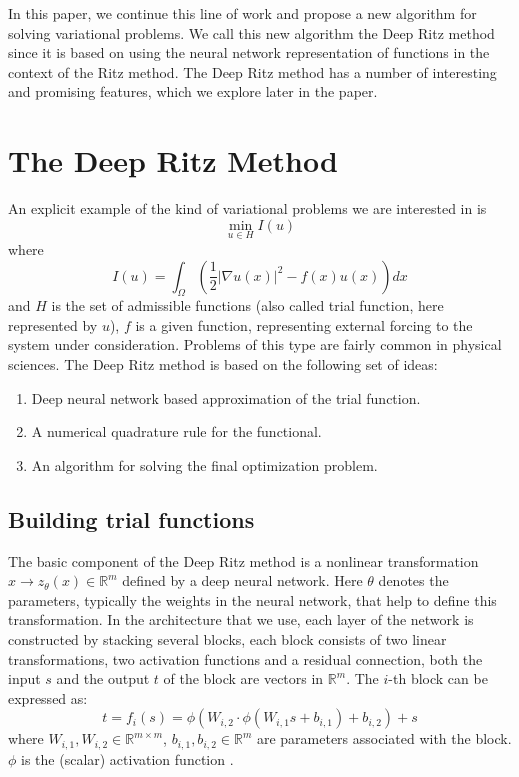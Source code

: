 \documentclass[a4paper,12pt]{article}
\begin{document}
In this paper, we continue this line of work and propose a new
algorithm for solving variational problems. We call this new algorithm
the Deep Ritz method since it is based on using the neural
network representation of functions in the context of the Ritz method.
The Deep Ritz method has a number of interesting and promising features,
which we explore later in the paper.


\section{The Deep Ritz Method}

An explicit example of the kind of variational problems we are interested
in is \cite{Evans}
\begin{equation}
\min_{u \in H} I(u)
\end{equation}
where
\begin{equation}
I(u) = \int_{\Omega} \left( \frac 12  |\nabla u(x)|^2 -  f(x) u(x) \right) dx
\label{I(u)}
\end{equation}
and $H$ is the set of admissible functions (also called
trial function, here represented by $u$), 
$f$ is a given function, representing
external forcing to the system under consideration.
Problems of this type are fairly common in physical sciences.
The Deep Ritz method is based on the following set of ideas:

\begin{enumerate}
\item Deep neural network based approximation of the trial function.
\item A numerical quadrature rule for the functional.
\item An algorithm for solving the final optimization problem.
\end{enumerate}


\subsection{Building trial functions}

The basic component of the Deep Ritz method is a nonlinear transformation $ x \rightarrow z_\theta (x)\in \mathbb{R}^{m} $ 
defined by a deep neural network.
Here $\theta$ denotes the parameters, typically the weights in the 
neural network, that help to define this transformation.
In the architecture that we use, each layer of the network is constructed by stacking several blocks, each block consists of two linear transformations, 
two activation functions and a residual connection, 
both the input $s$ and the output $t$ of the block are vectors in $\mathbb{R}^{m}$. 
The $i$-th block can  be expressed as:
\begin{equation}
t=f_i(s)=\phi(W_{i,2} \cdot \phi(W_{i,1} s +b_{i,1})+b_{i,2})+s
\label{block}
\end{equation}
where $W_{i,1},W_{i,2} \in \mathbb{R}^{m \times m}$, $b_{i,1},b_{i,2} \in \mathbb{R}^{m}$
are parameters associated with the block. 
$\phi$ is the (scalar) activation function \cite{book}.
\end{document}
